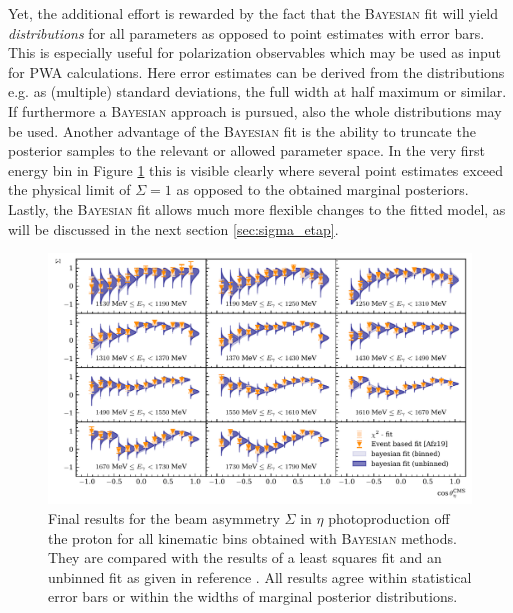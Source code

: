 Yet, the additional effort is rewarded by the fact that the \textsc{Bayesian} fit will yield \emph{distributions} for all parameters as opposed to point estimates with error bars. This is especially useful for polarization observables which may be used as input for PWA calculations. Here error estimates can be derived from the distributions e.g. as (multiple) standard deviations, the full width at half maximum or similar. If furthermore a \textsc{Bayesian} approach is  pursued, also the whole distributions may be used. Another advantage of the \textsc{Bayesian} fit is the ability to truncate the posterior samples to the relevant or allowed parameter space. In the very first energy bin in Figure \ref{fig:eta_res} this is visible clearly where several point estimates exceed the physical limit of $\Sigma=1$ as opposed to the obtained marginal posteriors. Lastly, the \textsc{Bayesian} fit allows much more flexible changes to the fitted model, as will be discussed in the next section \ref{sec:sigma_etap}.
\begin{landscape}
	\begin{figure}[htbp]
		\centering
		\includegraphics[width=\linewidth,height=.8\textwidth]{../bayes/event_based_fit/plots/sigma_eta.pdf}
		\caption{Final results for the beam asymmetry $\Sigma$ in $\eta$ photoproduction off the proton for all kinematic bins obtained with \textsc{Bayesian} methods. They are compared with the results of a least squares fit and an unbinned fit as given in reference \cite{farahphd}. All results agree within statistical error bars or within the widths of marginal posterior distributions.}
		\label{fig:eta_res}
	\end{figure}
\end{landscape}
      
